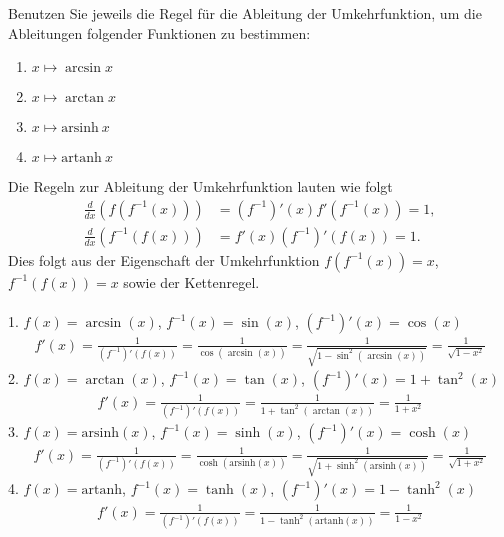\documentclass[11pt,answers]{exam}
\begin{document}
\begin{questions}

Benutzen Sie jeweils die Regel für die Ableitung der Umkehrfunktion, um die Ableitungen folgender Funktionen zu bestimmen:\\
\parbox{0.5\textwidth}{\begin{enumerate}
\item $x\mapsto\arcsin x$
\item $x\mapsto\arctan x$
\end{enumerate}}\parbox{0.5\textwidth}{\begin{enumerate}\setcounter{enumi}{2}
\item $x\mapsto \mathrm{arsinh}~x$
\item $x\mapsto \mathrm{artanh}~x$
\end{enumerate}}
\begin{solution}Die Regeln zur Ableitung der Umkehrfunktion lauten wie folgt
\begin{align*}
\frac{d}{dx}(f(f^{-1}(x)))&=(f^{-1})'(x)f'(f^{-1}(x))=1,
\\
\frac{d}{dx}(f^{-1}(f(x)))&=f'(x)(f^{-1})'(f(x))=1.
\end{align*}
Dies folgt aus der Eigenschaft der Umkehrfunktion 
$f(f^{-1}(x))=x$, $f^{-1}(f(x))=x$ sowie der Kettenregel.
\\ \\
1. $f(x)=\arcsin(x)$, $f^{-1}(x)=\sin(x)$, $(f^{-1})'(x)=\cos(x)$
\begin{align*}
f'(x)=\frac{1}{(f^{-1})'(f(x))}
=
\frac{1}{\cos(\arcsin(x))}
=
\frac{1}{\sqrt{1-\sin^2(\arcsin(x))}}
=
\frac{1}{\sqrt{1-x^2}}
\end{align*}
2. $f(x)=\arctan(x)$, $f^{-1}(x)=\tan(x)$, $(f^{-1})'(x)=1+\tan^2(x)$
\begin{align*}
f'(x)=\frac{1}{(f^{-1})'(f(x))}
=
\frac{1}{1+\tan^2(\arctan(x))}
=
\frac{1}{1+x^2}
\end{align*}
3. $f(x)=\text{arsinh}(x)$, $f^{-1}(x)=\sinh(x)$, $(f^{-1})'(x)=\cosh(x)$
\begin{align*}
f'(x)=\frac{1}{(f^{-1})'(f(x))}
=
\frac{1}{\cosh(\text{arsinh}(x))}
=
\frac{1}{\sqrt{1+\sinh^2(\text{arsinh}(x))}}
=
\frac{1}{\sqrt{1+x^2}}
\end{align*}
4. $f(x)=\text{artanh}$, $f^{-1}(x)=\tanh(x)$, $(f^{-1})'(x)=1-\tanh^2(x)$
\begin{align*}
f'(x)=\frac{1}{(f^{-1})'(f(x))}
=
\frac{1}{1-\tanh^2(\text{artanh}(x))}
=
\frac{1}{1-x^2}
\end{align*}
\end{solution}



\end{questions}
\end{document}
